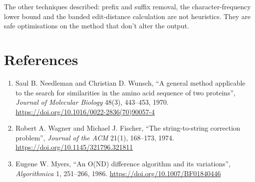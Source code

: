 \documentclass[
]{article}
\providecommand{\tightlist}{%
  \setlength{\itemsep}{0pt}\setlength{\parskip}{0pt}}
\begin{document}
The other techniques described: prefix and suffix removal, the
character-frequency lower bound and the banded edit-distance calculation
are not heuristics. They are safe optimisations on the method that don't
alter the output.

\hypertarget{references}{%
\section{References}\label{references}}

\begin{enumerate}
\def\labelenumi{\arabic{enumi}.}
\tightlist
\item
  Saul B. Needleman and Christian D. Wunsch, ``A general method
  applicable to the search for similarities in the amino acid sequence
  of two proteins'', \emph{Journal of Molecular Biology} 48(3),
  443--453, 1970. \url{https://doi.org/10.1016/0022-2836(70)90057-4}
\item
  Robert A. Wagner and Michael J. Fischer, ``The string-to-string
  correction problem'', \emph{Journal of the ACM} 21(1), 168--173, 1974.
  \url{https://doi.org/10.1145/321796.321811}
\item
  Eugene W. Myers, ``An O(ND) difference algorithm and its variations'',
  \emph{Algorithmica} 1, 251--266, 1986.
  \url{https://doi.org/10.1007/BF01840446}
\end{enumerate}
\end{document}
